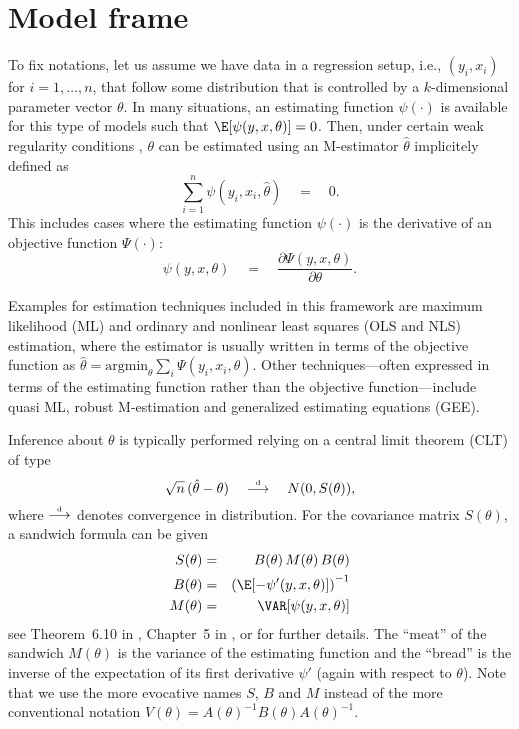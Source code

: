 \documentclass{Z}
\newcommand{\darrow}{\stackrel{\mbox{\tiny \textnormal{d}}}{\longrightarrow}}
\begin{document}
{
\section{Model frame} \label{sec:model}
\nopagebreak 

To fix notations, let us assume we have data in a regression setup, i.e., 
$(y_i, x_i)$ for $i = 1, \dots, n$, that follow some distribution that is 
controlled by a $k$-dimensional parameter vector $\theta$. In many situations,
an estimating function $\psi(\cdot)$ is available for this type of models
such that $\E[\psi(y, x, \theta)] = 0$. Then, under certain weak regularity
conditions \citep[see e.g.,][]{hac:White:1994}, 
$\theta$ can be estimated using an M-estimator $\hat \theta$ implicitely defined as
  \begin{equation} \label{eq:estfun}
    \sum_{i = 1}^n \psi(y_i, x_i, \hat \theta) \quad = \quad 0.
  \end{equation}
This includes cases where the estimating function $\psi(\cdot)$ is
the derivative of an objective function $\Psi(\cdot)$:
  \begin{equation} \label{eq:score}
    \psi(y, x, \theta) \quad = \quad \frac{\partial \Psi(y, x, \theta)}{\partial \theta}.
  \end{equation}
}
Examples for estimation techniques included in this framework are maximum likelihood (ML)
and ordinary and nonlinear least squares (OLS and NLS) estimation, where the estimator
is usually written in terms of the objective function as
$\hat \theta = \mbox{argmin}_\theta \sum_i \Psi(y_i, x_i, \theta)$.
Other techniques---often expressed in terms of the estimating function rather than
the objective function---include quasi ML, robust M-estimation and generalized estimating
equations (GEE). 

Inference about $\theta$ is typically performed relying on a central
limit theorem (CLT) of type
  \begin{equation} \label{eq:clt}
    \sqrt{n} \, (\hat \theta - \theta) \quad \darrow \quad N(0, S(\theta)),
  \end{equation}
where $\darrow$ denotes convergence in distribution. For the covariance matrix
$S(\theta)$, a sandwich formula can be given
\begin{eqnarray} \label{eq:sandwich}
  S(\theta) & = & B(\theta) \, M(\theta) \, B(\theta) \\  \label{eq:bread}
  B(\theta) & = & \left( \E[ - \psi'(y, x, \theta) ] \right)^{-1} \\  \label{obj}
  M(\theta) & = & \VAR[ \psi(y, x, \theta) ]
\end{eqnarray}
see Theorem~6.10 in \cite{hac:White:1994}, Chapter~5 in \cite{hac:Cameron+Trivedi:2005},
or \cite{hac:Stefanski+Boos:2002} for further details.
The ``meat'' of the sandwich $M(\theta)$ is the variance of the estimating
function and the ``bread'' is the inverse of the expectation of its first derivative $\psi'$
(again with respect to $\theta$). Note that we use the more evocative names $S$,
$B$ and $M$ instead of the more conventional notation $V(\theta) = A(\theta)^{-1} B(\theta)
A(\theta)^{-1}$.
\end{document}
